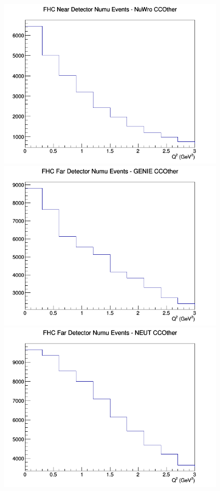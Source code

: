 \begin{figure}[h]
\includegraphics[width=\linewidth]{eff_Q2/FGT/CCOther_FHC_ND_numu_Q2_NuWro.png}
\endminipage
\newline
{}
\includegraphics[width=\linewidth]{eff_Q2/FGT/CCOther_FHC_FD_numu_Q2_GENIE.png}
\endminipage
{}
\includegraphics[width=\linewidth]{eff_Q2/FGT/CCOther_FHC_FD_numu_Q2_NEUT.png}

\end{figure}
